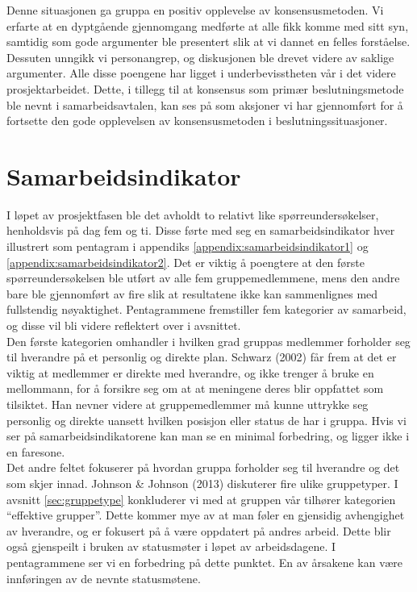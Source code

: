 Denne situasjonen ga gruppa en positiv opplevelse av konsensusmetoden. Vi erfarte at en dyptgående gjennomgang medførte at alle fikk komme med sitt syn, samtidig som gode argumenter ble presentert slik at vi dannet en felles forståelse. Dessuten unngikk vi personangrep, og diskusjonen ble drevet videre av saklige argumenter. Alle disse poengene har ligget i underbevisstheten vår i det videre prosjektarbeidet. Dette, i tillegg til at konsensus som primær beslutningsmetode ble nevnt i samarbeidsavtalen, kan ses på som aksjoner vi har gjennomført for å fortsette den gode opplevelsen av konsensusmetoden i beslutningssituasjoner.\\


\section{Samarbeidsindikator}
\label{sec:samarbeidsindikator}
I løpet av prosjektfasen ble det avholdt to relativt like spørreundersøkelser, henholdsvis på dag fem og ti. Disse førte med seg en samarbeidsindikator hver illustrert som pentagram i appendiks \ref{appendix:samarbeidsindikator1} og \ref{appendix:samarbeidsindikator2}. Det er viktig å poengtere at den første spørreundersøkelsen ble utført av alle fem gruppemedlemmene, mens den andre bare ble gjennomført av fire slik at resultatene ikke kan sammenlignes med fullstendig nøyaktighet. Pentagrammene fremstiller fem kategorier av samarbeid, og disse vil bli videre reflektert over i avsnittet.\\

Den første kategorien omhandler i hvilken grad gruppas medlemmer forholder seg til hverandre på et personlig og direkte plan. Schwarz (2002) får frem at det er viktig at medlemmer er direkte med hverandre, og ikke trenger å bruke en mellommann, for å forsikre seg om at at meningene deres blir oppfattet som tilsiktet. Han nevner videre at gruppemedlemmer må kunne uttrykke seg personlig og direkte uansett hvilken posisjon eller status de har i gruppa. Hvis vi ser på samarbeidsindikatorene kan man se en minimal forbedring, og ligger ikke i en faresone.\\

Det andre feltet fokuserer på hvordan gruppa forholder seg til hverandre og det som skjer innad. Johnson \& Johnson (2013) diskuterer fire ulike gruppetyper. I avsnitt \ref{sec:gruppetype} konkluderer vi med at gruppen vår tilhører kategorien ``effektive grupper''. Dette kommer mye av at man føler en gjensidig avhengighet av hverandre, og er fokusert på å være oppdatert på andres arbeid. Dette blir også gjenspeilt i bruken av statusmøter i løpet av arbeidsdagene. I pentagrammene ser vi en forbedring på dette punktet. En av årsakene kan være innføringen av de nevnte statusmøtene.\\

